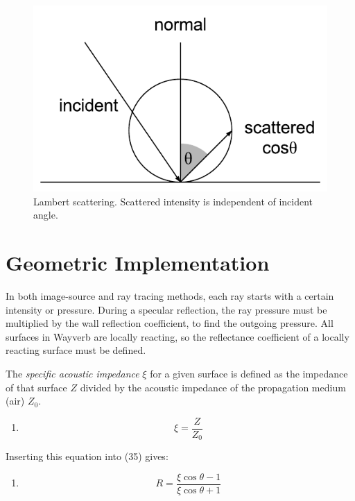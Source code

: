 \documentclass[]{scrreprt}
\providecommand{\tightlist}{%
  \setlength{\itemsep}{0pt}\setlength{\parskip}{0pt}}
\begin{document}
\begin{figure}[htbp]
\centering
\includegraphics{images/lambert.pdf}
\caption{Lambert scattering. Scattered intensity is independent of
incident angle.\label{fig:lambert}}
\end{figure}

\section{Geometric Implementation}\label{geometric-implementation}

In both image-source and ray tracing methods, each ray starts with a
certain intensity or pressure. During a specular reflection, the ray
pressure must be multiplied by the wall reflection coefficient, to find
the outgoing pressure. All surfaces in Wayverb are locally reacting, so
the reflectance coefficient of a locally reacting surface must be
defined.

The \emph{specific acoustic impedance} \(\xi\) for a given surface is
defined as the impedance of that surface \(Z\) divided by the acoustic
impedance of the propagation medium (air) \(Z_0\).

\begin{enumerate}
\def\labelenumi{(\arabic{enumi})}
\setcounter{enumi}{38}
\tightlist
\item
  \[\xi=\frac{Z}{Z_0}\]
\end{enumerate}

Inserting this equation into (35) gives:

\begin{enumerate}
\def\labelenumi{(\arabic{enumi})}
\setcounter{enumi}{39}
\tightlist
\item
  \[R=\frac{\xi\cos\theta-1}{\xi\cos\theta+1}\]
\end{enumerate}
\end{document}
